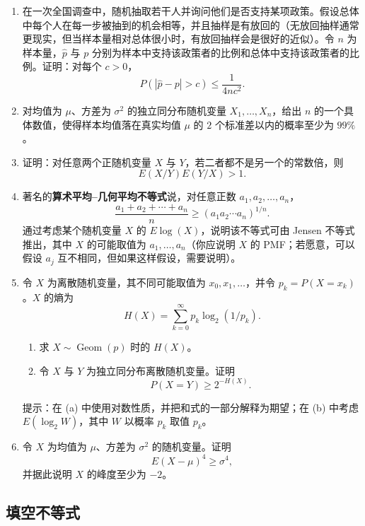 \documentclass[UTF8, 12pt, fontset=fandol, oneside]{ctexart}
\begin{document}
\begin{enumerate}
  \item 在一次全国调查中，随机抽取若干人并询问他们是否支持某项政策。假设总体中每个人在每一步被抽到的机会相等，并且抽样是有放回的（无放回抽样通常更现实，但当样本量相对总体很小时，有放回抽样会是很好的近似）。令 $n$ 为样本量，$\hat p$ 与 $p$ 分别为样本中支持该政策者的比例和总体中支持该政策者的比例。证明：对每个 $c>0$，
  \[
    P(|\hat p-p|>c)\le \frac{1}{4nc^2}.
  \]

  \item 对均值为 $\mu$、方差为 $\sigma^2$ 的独立同分布随机变量 $X_1,\ldots,X_n$，给出 $n$ 的一个具体数值，使得样本均值落在真实均值 $\mu$ 的 $2$ 个标准差以内的概率至少为 $99\%$。

  \item 证明：对任意两个正随机变量 $X$ 与 $Y$，若二者都不是另一个的常数倍，则
  \[
    E(X/Y)E(Y/X)>1.
  \]

  \item 著名的\textbf{算术平均--几何平均不等式}说，对任意正数 $a_1,a_2,\ldots,a_n$，
  \[
    \frac{a_1+a_2+\cdots+a_n}{n}\ge (a_1a_2\cdots a_n)^{1/n}.
  \]
  通过考虑某个随机变量 $X$ 的 $E\log(X)$，说明该不等式可由 Jensen 不等式推出，其中 $X$ 的可能取值为 $a_1,\ldots,a_n$（你应说明 $X$ 的 PMF；若愿意，可以假设 $a_j$ 互不相同，但如果这样假设，需要说明）。

  \item 令 $X$ 为离散随机变量，其不同可能取值为 $x_0,x_1,\ldots$，并令 $p_k=P(X=x_k)$。$X$ 的熵为
  \[
    H(X)=\sum_{k=0}^{\infty}p_k\log_2(1/p_k).
  \]
  \begin{enumerate}
    \item 求 $X\sim\operatorname{Geom}(p)$ 时的 $H(X)$。
    \item 令 $X$ 与 $Y$ 为独立同分布离散随机变量。证明
    \[
      P(X=Y)\ge 2^{-H(X)}.
    \]
  \end{enumerate}
  提示：在 (a) 中使用对数性质，并把和式的一部分解释为期望；在 (b) 中考虑 $E(\log_2 W)$，其中 $W$ 以概率 $p_k$ 取值 $p_k$。

  \item 令 $X$ 为均值为 $\mu$、方差为 $\sigma^2$ 的随机变量。证明
  \[
    E(X-\mu)^4\ge \sigma^4,
  \]
  并据此说明 $X$ 的峰度至少为 $-2$。
\end{enumerate}

\subsection*{填空不等式}
\end{document}
